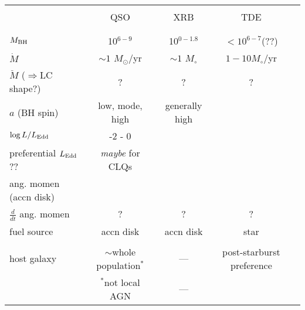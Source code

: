 \documentclass[11pt]{article}
\begin{document}
\clearpage
\LARGE
\begin{table}
    \begin{center}
      \begin{tabular}{lcccr} 
        \hline
        \hline 
                                            & & & \\
                                               & QSO                                & XRB                                  & TDE                \\
                                            & & & \\
        \hline 
                                            & & & \\
$M_{\rm BH}$                            & 10$^{6-9}$                       &  10$^{0-1.8}$                    &  $<10^{6-7}$(??)           \\ 
$\dot{M}$                               &  $\sim1$ $M_{\odot}$/yr      &    $\sim1$ $M_{\circ}$       & $1-10 M_{\circ}$/yr   \\
$\ddot{M}$ ($\Rightarrow$LC shape?)          &  ?                                    &    ?                                    & ? \\
$a$ (BH spin)                         & low, mode, high              & generally high                  &  \\
$\log L/ L_{\rm Edd}$                    & -2 - 0                             & & \\
preferential $L_{\rm Edd}$??       & {\it maybe} for CLQs              & & \\
ang. momen (accn disk)                   &                                       &                                   & \\           
$\frac{d}{dt}$ ang. momen      &    ?                                   &      ?                             & ? \\           
fuel source                              & accn disk & accn disk & star \\ 
                                            & & & \\
host galaxy                         & $\sim$whole population$^{*}$   & ---  & post-starburst preference \\  
                                          & $^{*}$not local AGN   & ---  & \\  

\end{tabular}
\end{center}
\end{table}
\end{document}
